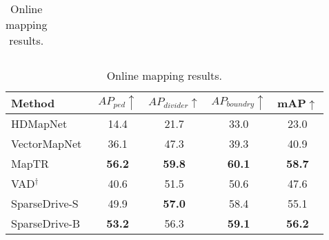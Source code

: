 \begin{table}[t]
\begin{subtable}[h]{1.0\textwidth}
\begin{subtable}[h]{0.45\textwidth}
{\begin{tabular}{l|cccc}
\bottomrule
\end{tabular}
}
\caption{Multi-object tracking results.}
\label{tab:tracking}
\end{subtable}
\hfill
\begin{subtable}[h]{0.55\textwidth}
\scriptsize
{
\setlength{\tabcolsep}{0.6mm}
\begin{tabular}{l|ccc|c}
\toprule
Method & $AP_{ped}\uparrow$ & $AP_{divider}\uparrow$ & $AP_{boundry}\uparrow$ & \cellcolor{gray!30}mAP$\uparrow$ \\
\midrule
HDMapNet~\cite{hdmapnet} & 14.4 & 21.7 & 33.0 & \cellcolor{gray!30}23.0 \\
VectorMapNet~\cite{vectormapnet} & 36.1 & 47.3 & 39.3 & \cellcolor{gray!30}40.9 \\
MapTR~\cite{maptr} & \textbf{56.2} & \textbf{59.8} & \textbf{60.1} & \cellcolor{gray!30}\textbf{58.7} \\
\midrule
VAD$^\dagger$~\cite{vad} & 40.6 & 51.5 & 50.6 & \cellcolor{gray!30}47.6 \\
SparseDrive-S & 49.9 & \textbf{57.0} & 58.4 & \cellcolor{gray!30}55.1 \\
SparseDrive-B & \textbf{53.2} & 56.3 & \textbf{59.1} & \cellcolor{gray!30}\textbf{56.2} \\
\bottomrule
\end{tabular}
}
\caption{Online mapping results.}
\label{tab:online_mapping}
\end{subtable}
\end{subtable}
\end{table}